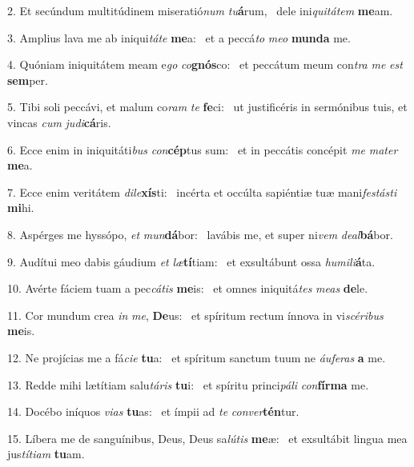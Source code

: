 2. Et secúndum multitúdinem miseratió\textit{num} \textit{tu}\textbf{á}rum, \ast\  dele ini\textit{qui}\textit{tá}\textit{tem} \textbf{me}am.\

3. Amplius lava me ab iniqui\textit{tá}\textit{te} \textbf{me}a: \ast\  et a peccá\textit{to} \textit{me}\textit{o} \textbf{mun}\textbf{da} me.\

4. Quóniam iniquitátem meam e\textit{go} \textit{co}\textbf{gnós}co: \ast\  et peccátum meum con\textit{tra} \textit{me} \textit{est} \textbf{sem}per.\

5. Tibi soli peccávi, et malum co\textit{ram} \textit{te} \textbf{fe}ci: \ast\  ut justificéris in sermónibus tuis, et vincas \textit{cum} \textit{ju}\textit{di}\textbf{cá}ris.\

6. Ecce enim in iniquitáti\textit{bus} \textit{con}\textbf{cép}tus sum: \ast\  et in peccátis concépit \textit{me} \textit{ma}\textit{ter} \textbf{me}a.\

7. Ecce enim veritátem \textit{di}\textit{le}\textbf{xís}ti: \ast\  incérta et occúlta sapiéntiæ tuæ mani\textit{fes}\textit{tás}\textit{ti} \textbf{mi}hi.\

8. Aspérges me hyssópo, \textit{et} \textit{mun}\textbf{dá}bor: \ast\  lavábis me, et super ni\textit{vem} \textit{de}\textit{al}\textbf{bá}bor.\

9. Audítui meo dabis gáudium \textit{et} \textit{læ}\textbf{tí}tiam: \ast\  et exsultábunt ossa \textit{hu}\textit{mi}\textit{li}\textbf{á}ta.\

10. Avérte fáciem tuam a pec\textit{cá}\textit{tis} \textbf{me}is: \ast\  et omnes iniquitá\textit{tes} \textit{me}\textit{as} \textbf{de}le.\

11. Cor mundum crea \textit{in} \textit{me}, \textbf{De}us: \ast\  et spíritum rectum ínnova in vi\textit{scé}\textit{ri}\textit{bus} \textbf{me}is.\

12. Ne projícias me a fá\textit{ci}\textit{e} \textbf{tu}a: \ast\  et spíritum sanctum tuum ne \textit{áu}\textit{fe}\textit{ras} \textbf{a} me.\

13. Redde mihi lætítiam salu\textit{tá}\textit{ris} \textbf{tu}i: \ast\  et spíritu princi\textit{pá}\textit{li} \textit{con}\textbf{fír}\textbf{ma} me.\

14. Docébo iníquos \textit{vi}\textit{as} \textbf{tu}as: \ast\  et ímpii ad \textit{te} \textit{con}\textit{ver}\textbf{tén}tur.\

15. Líbera me de sanguínibus, Deus, Deus sa\textit{lú}\textit{tis} \textbf{me}æ: \ast\  et exsultábit lingua mea jus\textit{tí}\textit{ti}\textit{am} \textbf{tu}am.\

